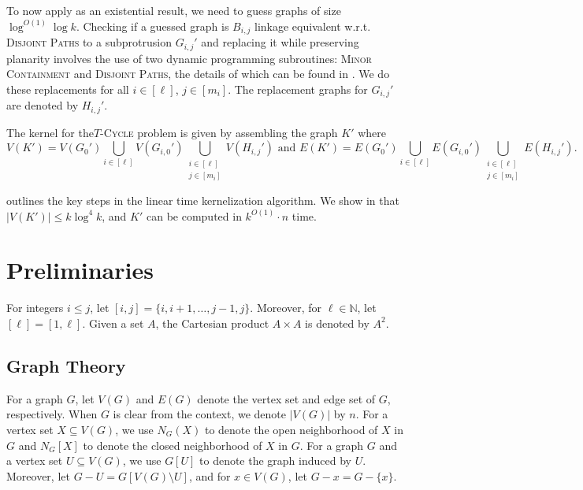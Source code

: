\documentclass{article}
\numberwithin{claimcounter}{lemma}
\newcommand{\tcycle}{$T$-\textsc{Cycle}\xspace}
\newcommand{\dispaths}{\textsc{Disjoint Paths}\xspace}
\begin{document}
To now apply \cite{DBLP:conf/focs/0001Z23} as an existential result, we need to guess graphs of size $\log^{O(1)}\log k$. Checking if a guessed graph is $B_{i,j}$ linkage equivalent w.r.t. \dispaths to a subprotrusion $G_{i,j}'$ and replacing it while preserving planarity involves the use of two dynamic programming subroutines: \textsc{Minor Containment} and \dispaths, the details of which can be found in . We do these replacements for all $i \in [\ell]$, $j \in [m_i]$. The replacement graphs for $G_{i,j}'$ are denoted by $H_{i,j}'$.

The kernel for the\tcycle problem is given by assembling the graph $K'$ where 
    \[ V(K') = V(G_0') \bigcup_{i\in [\ell]} V(G_{i,0}') \bigcup_{\substack{i\in [\ell] \\ j\in [m_i]}} V(H_{i,j}') \text{ and }  E(K') = E(G_0') \bigcup_{i\in [\ell]} E(G_{i,0}') \bigcup_{\substack{i\in [\ell] \\ j\in [m_i]}} E(H_{i,j}').\]

 outlines the key steps in the linear time kernelization algorithm. We show in  that $|V(K')|\leq k \log^4 k$, and $K'$ can be computed in $k^{O(1)}\cdot n$ time.








\section{Preliminaries}\label{S:prelim}

For integers $i\leq j$, let $[i,j]=\{i, i+1,\ldots, j-1, j\}$. Moreover, for $\ell\in \mathbb{N}$, let $[\ell] = [1,\ell]$. 
Given a set $A$, the Cartesian product $A\times A$ is denoted by $A^2$.

\subsection{Graph Theory}
For a graph $G$, let $V(G)$ and $E(G)$ denote the vertex set and edge set of $G$, respectively. When $G$ is clear from the context, we denote $|V(G)|$ by $n$. For a vertex set $X \subseteq V(G)$, we use $N_G(X)$ to denote the open neighborhood of $X$ in $G$ and $N_G[X]$ to denote the closed neighborhood of $X$ in $G$. For a graph $G$ and a vertex set $U\subseteq V(G)$, we use $G[U]$ to denote the graph induced by $U$. Moreover, let $G-U = G[V(G)\setminus U]$, and for $x\in V(G)$, let $G-x = G-\{x\}$. 
\end{document}
